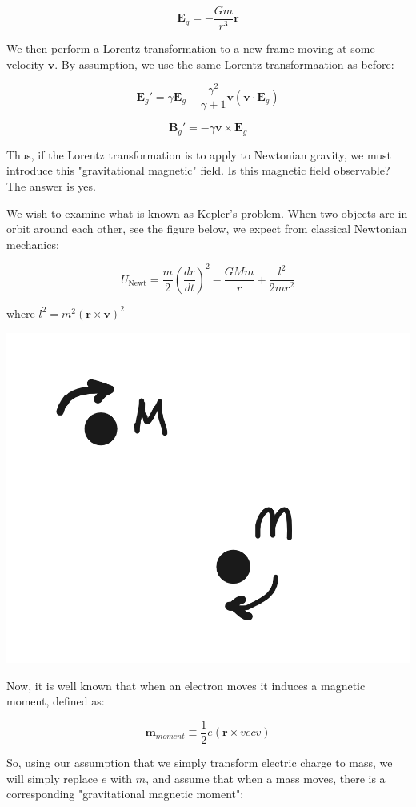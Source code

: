 \documentclass {article}
\renewcommand\vec{\mathbf}
\begin{document}
$$\vec E_g = - \frac {Gm} {r^3} \vec r $$

We then perform a Lorentz-transformation to a new frame moving at some velocity $\vec v$. By assumption, we use the same Lorentz transformaation as before:

$$\vec E_g' = \gamma \vec E_g - \frac {\gamma^2} {\gamma + 1} \vec v (\vec v \cdot \vec E_g) $$

$$ \vec B_g' = - \gamma \vec v \times \vec E_g$$

Thus, if the Lorentz transformation is to apply to Newtonian gravity, we must introduce this "gravitational magnetic" field. Is this magnetic field observable? The answer is yes.

We wish to examine what is known as  Kepler's problem. When two objects are in orbit around each other, see the figure below, we expect from classical Newtonian mechanics:

$$ U_{\text{Newt}} = \frac m 2 (\frac {dr} {dt})^2 - \frac {GMm} r + \frac {l^2} {2mr^2}$$

where $l^2 = m^2 (\vec r \times \vec v)^2$

\begin{center}
	\includegraphics[scale=0.1]{autodraw.png}
\end{center}

Now, it is well known that when an electron moves it induces a magnetic moment, defined as:

$$\vec m_{moment} \equiv \frac 1 {2} e (\vec r \times vec v)$$

So, using our assumption that we simply transform electric charge to mass, we will simply replace $e$ with $m$, and assume that when a mass moves, there is a corresponding "gravitational magnetic moment":
\end{document}
